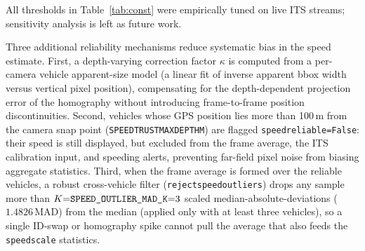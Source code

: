 \documentclass[conference]{IEEEtran}
\renewcommand{\_}{\textunderscore\allowbreak}
\begin{document}
All thresholds in Table~\ref{tab:const} were empirically tuned on live ITS streams;
sensitivity analysis is left as future work.

Three additional reliability mechanisms reduce systematic bias in the speed estimate.
First, a depth-varying correction factor $\kappa$ is computed from a per-camera vehicle apparent-size model (a linear fit of inverse apparent bbox width versus vertical pixel position), compensating for the depth-dependent projection error of the homography without introducing frame-to-frame position discontinuities.
Second, vehicles whose GPS position lies more than 100\,m from the camera snap point (\texttt{SPEED\_TRUST\_MAX\_DEPTH\_M}) are flagged \texttt{speed\_reliable=False}: their speed is still displayed, but excluded from the frame average, the ITS calibration input, and speeding alerts, preventing far-field pixel noise from biasing aggregate statistics.
Third, when the frame average is formed over the reliable vehicles, a robust cross-vehicle filter (\texttt{\_reject\_speed\_outliers}) drops any sample more than $K{=}\texttt{SPEED\_OUTLIER\_MAD\_K}{=}3$ scaled median-absolute-deviations ($1.4826\,\mathrm{MAD}$) from the median (applied only with at least three vehicles), so a single ID-swap or homography spike cannot pull the average that also feeds the \texttt{speed\_scale} statistics.
\end{document}
